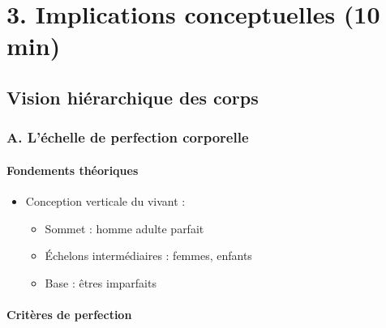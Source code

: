 \documentclass[
  letterpaper,
  DIV=11,
  numbers=noendperiod]{scrreprt}
\providecommand{\tightlist}{%
  \setlength{\itemsep}{0pt}\setlength{\parskip}{0pt}}\usepackage{longtable,booktabs,array}
\begin{document}
\section{}\label{section-3}


\chapter{3. Implications conceptuelles (10
min)}\label{implications-conceptuelles-10-min}

\section{Vision hiérarchique des
corps}\label{vision-hiuxe9rarchique-des-corps}

\subsection{A. L'échelle de perfection
corporelle}\label{a.-luxe9chelle-de-perfection-corporelle}

\subsubsection{Fondements théoriques}\label{fondements-thuxe9oriques}

\begin{itemize}
\tightlist
\item
  Conception verticale du vivant :

  \begin{itemize}
  \tightlist
  \item
    Sommet : homme adulte parfait
  \item
    Échelons intermédiaires : femmes, enfants
  \item
    Base : êtres imparfaits
  \end{itemize}
\end{itemize}

\subsubsection{Critères de perfection}\label{crituxe8res-de-perfection}
\end{document}
